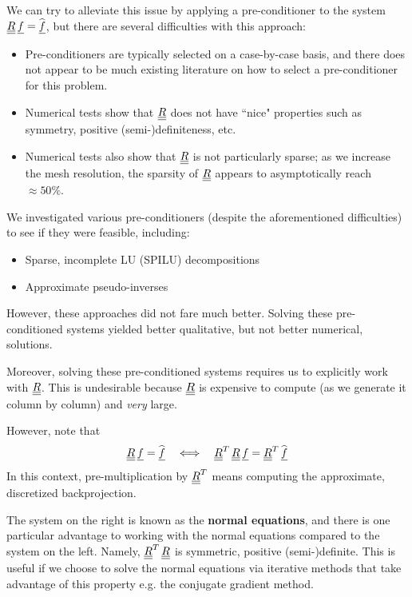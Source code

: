 \par 
We can try to alleviate this issue by applying a pre-conditioner to the system ${\underline{\underline{R}}} \, {\underline{f}} = \widehat{{\underline{f}}}$, but there are several difficulties with this approach:
\begin{itemize}
    \item Pre-conditioners are typically selected on a case-by-case basis, and there does not appear to be much existing literature on how to select a pre-conditioner for this problem.
    \item Numerical tests show that ${\underline{\underline{R}}}$ does not have ``nice" properties such as symmetry, positive (semi-)definiteness, etc.
    \item Numerical tests also show that ${\underline{\underline{R}}}$ is not particularly sparse; as we increase the mesh resolution, the sparsity of ${\underline{\underline{R}}}$ appears to asymptotically reach $\approx 50 \%$.
\end{itemize}
We investigated various pre-conditioners (despite the aforementioned difficulties) to see if they were feasible, including:
\begin{itemize}
    \item Sparse, incomplete LU (SPILU) decompositions
    \item Approximate pseudo-inverses 
\end{itemize}
However, these approaches did not fare much better.
Solving these pre-conditioned systems yielded better qualitative, but not better numerical, solutions.
\par 
Moreover, solving these pre-conditioned systems requires us to explicitly work with ${\underline{\underline{R}}}$.
This is undesirable because ${\underline{\underline{R}}}$ is expensive to compute (as we generate it column by column) and \textit{very} large.
\par 
However, note that 
\begin{align}
    {\underline{\underline{R}}} \, {\underline{f}} = \widehat{{\underline{f}}} \quad \Longleftrightarrow \quad {\underline{\underline{R}}}^{T} \, {\underline{\underline{R}}} \, {\underline{f}} = {\underline{\underline{R}}}^{T} \, \widehat{{\underline{f}}}
\end{align}
In this context, pre-multiplication by ${\underline{\underline{R}}}^{T}$ means computing the approximate, discretized backprojection.
\par 
The system on the right is known as the \textbf{normal equations}, and there is one particular advantage to working with the normal equations compared to the system on the left.
Namely, ${\underline{\underline{R}}}^{T} \, {\underline{\underline{R}}}$ is symmetric, positive (semi-)definite.
This is useful if we choose to solve the normal equations via iterative methods that take advantage of this property e.g. the conjugate gradient method.
